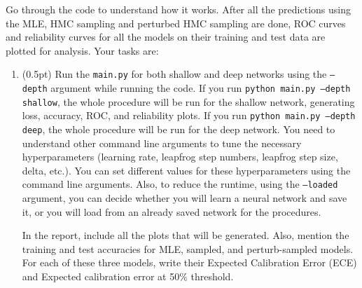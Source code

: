 \begin{enumerate}
Go through the code to understand how it works. After all the predictions using the MLE, HMC sampling and perturbed HMC sampling are done, ROC curves and reliability curves for all the models on their training and test data are plotted for analysis. Your tasks are:

\begin{enumerate}
    \item (0.5pt) Run the \texttt{main.py} for both shallow and deep networks using the \texttt{--depth} argument while running the code. If you run \texttt{python main.py --depth shallow}, the whole procedure will be run for the shallow network, generating loss, accuracy, ROC, and reliability plots. If you run \texttt{python main.py --depth deep}, the whole procedure will be run for the deep network. You need to understand other command line arguments to tune the necessary hyperparameters (learning rate, leapfrog step numbers, leapfrog step size, delta, etc.). You can set different values for these hyperparameters using the command line arguments. Also, to reduce the runtime, using the \texttt{--loaded} argument, you can decide whether you will learn a neural network and save it, or you will load from an already saved network for the procedures.
    
    In the report, include all the plots that will be generated. Also, mention the training and test accuracies for MLE, sampled, and perturb-sampled models. For each of these three models, write their Expected Calibration Error (ECE) and Expected calibration error at 50\% threshold.


\end{enumerate}
\end{enumerate}
